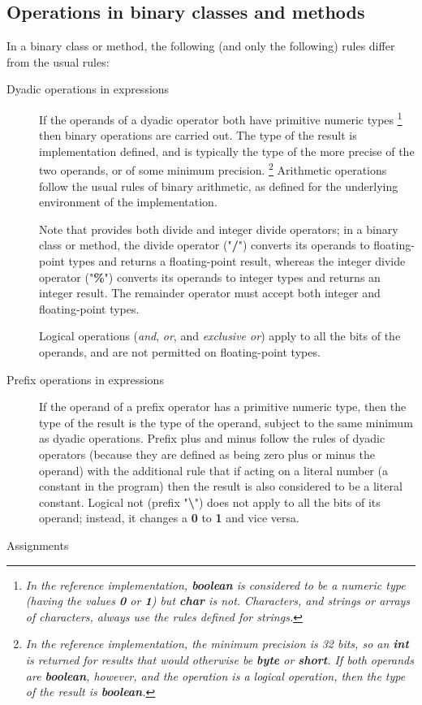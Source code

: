 \subsection{Operations in binary classes and methods}\label{refbindif}
 
In a binary class or method, the following (and only the following)
rules differ from the usual rules:
\begin{description}
\item[Dyadic operations in expressions]
 
If the operands of a dyadic operator both have primitive numeric types
\footnote{
\emph{In the reference implementation, \textbf{boolean} is considered to
be a numeric type (having the values \textbf{0} or \textbf{1})
but \textbf{char} is not.
Characters, and strings or arrays of characters, always use the rules
defined for \nr{} strings.}
}
then binary operations are carried out.  The type of the result is
implementation defined, and is typically the type of the more precise of
the two operands, or of some minimum precision.
\footnote{
\emph{In the reference implementation, the minimum precision is 32 bits,
so an \textbf{int} is returned for results that would otherwise
be \textbf{byte} or \textbf{short}.
If both operands are \textbf{boolean}, however, and the operation is a
logical operation, then the type of the result
is \textbf{boolean}.}
}
Arithmetic operations follow the usual rules of binary arithmetic, as
defined for the underlying environment of the implementation.
 
Note that \nr{} provides both divide and integer divide operators; in
a binary class or method, the divide operator ("\textbf{/}")
converts its operands to floating-point types and returns a
floating-point result, whereas the integer divide operator
("\textbf{\%}") converts its operands to integer types and
returns an integer result.
The remainder operator must accept both integer and floating-point
types.
 
Logical operations (\emph{and}, \emph{or}, and \emph{exclusive
or}) apply to all the bits of the operands, and are not permitted
on floating-point types.
\item[Prefix operations in expressions]
 
If the operand of a prefix operator has a primitive numeric type, then
the type of the result is the type of the operand, subject to
the same minimum as dyadic operations.
Prefix plus and minus follow the rules of dyadic operators (because they
are defined as being zero plus or minus the operand) with the additional
rule that if acting on a literal number (a constant in the program) then
the result is also considered to be a literal constant.
Logical not (prefix "\textbf{\textbackslash }") does not apply to all
the bits of its operand; instead, it changes a \textbf{0}
to \textbf{1} and vice versa.
\item[Assignments]
 

\end{description}
